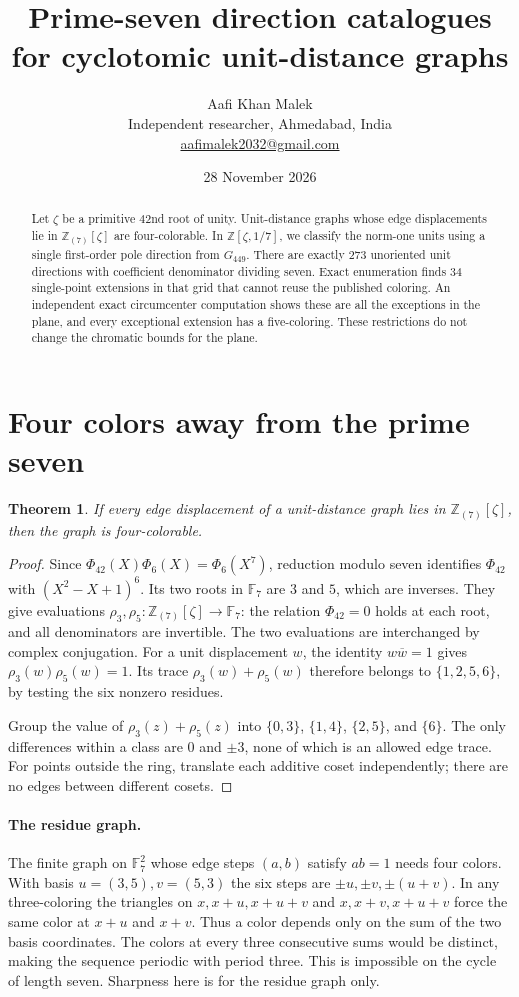 \documentclass[11pt,letterpaper]{article}
\title{Prime-seven direction catalogues for cyclotomic unit-distance graphs}
\author{Aafi Khan Malek\\ \small Independent researcher, Ahmedabad, India\\
\small\href{mailto:aafimalek2032@gmail.com}{aafimalek2032@gmail.com}}
\date{28 November 2026}
\newtheorem{theorem}{Theorem}
\newcommand{\Z}{\mathbb Z}
\newcommand{\F}{\mathbb F}
\begin{document}
\maketitle
\begin{abstract}
Let $\zeta$ be a primitive $42$nd root of unity. Unit-distance
graphs whose edge displacements lie in $\Z_{(7)}[\zeta]$ are
four-colorable. In $\Z[\zeta,1/7]$,
we classify the norm-one units using a single first-order pole
direction from $G_{449}$. There are exactly $273$ unoriented unit
directions with coefficient denominator dividing seven. Exact
enumeration finds 34 single-point extensions in that grid that
cannot reuse the published coloring. An independent exact
circumcenter computation shows these are all the exceptions in
the plane, and every exceptional extension has a five-coloring. These restrictions
do not change the chromatic bounds for the plane.
\end{abstract}

\section{Four colors away from the prime seven}

\begin{theorem}
If every edge displacement of a unit-distance graph lies in
$\Z_{(7)}[\zeta]$, then the graph is four-colorable.
\end{theorem}

\begin{proof}
Since $\Phi_{42}(X)\Phi_6(X)=\Phi_6(X^7)$, reduction modulo seven
identifies $\Phi_{42}$ with $(X^2-X+1)^6$. Its two roots in $\F_7$
are $3$ and $5$, which are inverses. They give evaluations
$\rho_3,\rho_5:\Z_{(7)}[\zeta]\to\F_7$: the relation
$\Phi_{42}=0$ holds at each root, and all denominators are
invertible. The two evaluations are interchanged by complex
conjugation. For a unit displacement $w$, the identity
$w\overline w=1$ gives
$\rho_3(w)\rho_5(w)=1$. Its trace $\rho_3(w)+\rho_5(w)$ therefore
belongs to $\{1,2,5,6\}$, by testing the six nonzero residues.

Group the value of $\rho_3(z)+\rho_5(z)$ into
$\{0,3\}$, $\{1,4\}$, $\{2,5\}$, and $\{6\}$.
The only differences within a class are $0$ and $\pm3$, none of
which is an allowed edge trace. For points outside the ring,
translate each additive coset independently; there are no edges
between different cosets.
\end{proof}

\paragraph{The residue graph.}
The finite graph on $\F_7^2$ whose edge steps $(a,b)$ satisfy
$ab=1$ needs four colors. With basis $u=(3,5),v=(5,3)$ the six
steps are $\pm u,\pm v,\pm(u+v)$. In any three-coloring the
triangles on $x,x+u,x+u+v$ and $x,x+v,x+u+v$ force the same
color at $x+u$ and $x+v$. Thus a color depends only on the
sum of the two basis coordinates. The colors at every three
consecutive sums would be distinct, making the sequence
periodic with period three. This is impossible on the cycle
of length seven. Sharpness here is for the residue graph only.
\end{document}
